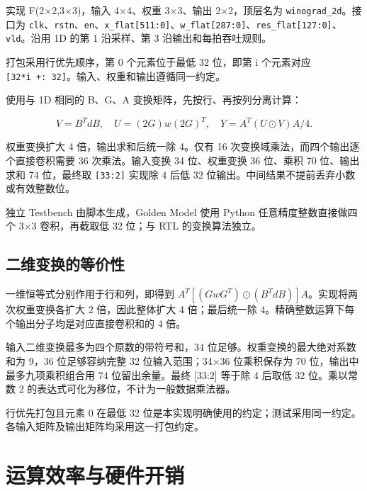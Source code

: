\documentclass[
  10pt,
  a4paper,
]{article}
\begin{document}
实现 F(2×2,3×3)，输入 4×4、权重 3×3、输出 2×2，顶层名为
\texttt{winograd\_2d}。接口为
\texttt{clk}、\texttt{rstn}、\texttt{en}、\texttt{x\_flat{[}511:0{]}}、\texttt{w\_flat{[}287:0{]}}、\texttt{res\_flat{[}127:0{]}}、\texttt{vld}。沿用
1D 的第 1 沿采样、第 3 沿输出和每拍吞吐规则。

打包采用行优先顺序，第 0 个元素位于最低 32 位，即第 i 个元素对应
\texttt{{[}32*i\ +:\ 32{]}}。输入、权重和输出遵循同一约定。

使用与 1D 相同的 B、G、A 变换矩阵，先按行、再按列分离计算：

\[V=B^TdB,\quad U=(2G)w(2G)^T,\quad Y=A^T(U\odot V)A/4.\]

权重变换扩大 4 倍，输出求和后统一除 4。仅有 16
次变换域乘法，而四个输出逐个直接卷积需要 36 次乘法。输入变换 34
位、权重变换 36 位、乘积 70 位、输出求和 74 位，最终取
\texttt{{[}33:2{]}} 实现除 4 后低 32
位输出。中间结果不提前丢弃小数或有效整数位。

独立 Testbench 由脚本生成，Golden Model 使用 Python
任意精度整数直接做四个 3×3 卷积，再截取低 32 位；与 RTL 的变换算法独立。

\subsection{二维变换的等价性}\label{ux4e8cux7ef4ux53d8ux6362ux7684ux7b49ux4ef7ux6027}

一维恒等式分别作用于行和列，即得到
\(A^T[(GwG^T)\odot(B^TdB)]A\)。实现将两次权重变换各扩大 2
倍，因此整体扩大 4 倍；最后统一除
4。精确整数运算下每个输出分子均是对应直接卷积和的 4 倍。

输入二维变换最多为四个原数的带符号和，34
位足够。权重变换的最大绝对系数和为 9，36 位足够容纳完整 32
位输入范围；34×36 位乘积保存为 70 位，输出中最多九项乘积组合用 74
位留出余量。最终 {[}33:2{]} 等于除 4 后取低 32 位。乘以常数 2
的表达式可化为移位，不计为一般数据乘法器。

行优先打包且元素 0 在最低 32
位是本实现明确使用的约定；测试采用同一约定。各输入矩阵及输出矩阵均采用这一打包约定。

\section{运算效率与硬件开销}\label{ux8fd0ux7b97ux6548ux7387ux4e0eux786cux4ef6ux5f00ux9500}
\end{document}
